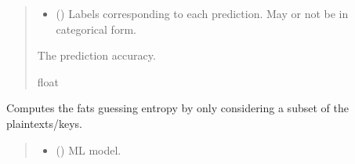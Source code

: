 \documentclass[letterpaper,10pt,english]{sphinxmanual}
\begin{document}
\begin{fulllineitems}
\begin{fulllineitems}
\begin{quote}
\begin{description}
\begin{itemize}
\item {} 
\sphinxAtStartPar
{} (\sphinxstyleliteralemphasis{\sphinxupquote{{[}}}\sphinxstyleliteralemphasis{\sphinxupquote{{]}}}\sphinxstyleliteralemphasis{\sphinxupquote{, }}\sphinxstyleliteralemphasis{\sphinxupquote{{[}}}\sphinxstyleliteralemphasis{\sphinxupquote{{[}}}\sphinxstyleliteralemphasis{\sphinxupquote{{]}}}\sphinxstyleliteralemphasis{\sphinxupquote{{]}}}) \textendash{} Labels corresponding to each prediction. May or not be in categorical form.

\end{itemize}

\sphinxAtStartPar
The prediction accuracy.

\sphinxAtStartPar
float

\end{description}\end{quote}

\end{fulllineitems}


\begin{fulllineitems}
\label{\detokenize{MLSCAlib.Attacks:MLSCAlib.Attacks.attack.Attack.get_fast_GE}}
\pysigstartsignatures
{}
\pysigstopsignatures
\sphinxAtStartPar
Computes the fats guessing entropy by only considering a subset of the plaintexts/keys.
\begin{quote}\begin{description}
\begin{itemize}
\item {} 
\sphinxAtStartPar
{} () \textendash{} ML model.


\end{itemize}
\end{description}
\end{quote}
\end{fulllineitems}
\end{fulllineitems}
\end{document}
